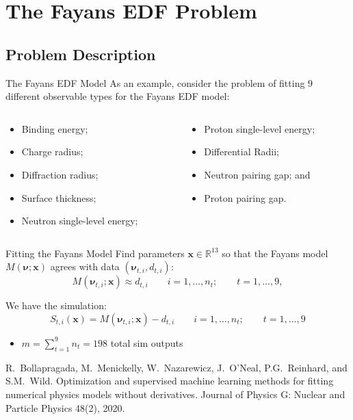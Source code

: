 \documentclass[aspectratio=169]{beamer}
\newcommand{\vx}{\mathbf{x}}
\newcommand{\nub}{\mathbf{\nu}}
\begin{document}
\section{The Fayans EDF Problem}
\subsection{Problem Description}
\begin{frame}{The Fayans EDF Model}
As an example, consider the problem of fitting $9$ different observable
types for the Fayans EDF model:
\begin{columns}
\begin{column}{0.48\textwidth}
\begin{itemize}
\item Binding energy;
\item Charge radius;
\item Diffraction radius;
\item Surface thickness;
\item Neutron single-level energy;
\end{itemize}
\end{column}
\begin{column}{0.48\textwidth}
\begin{itemize}
\item Proton single-level energy;
\item Differential Radii;
\item Neutron pairing gap; and
\item Proton pairing gap.
\end{itemize}
\end{column}
\end{columns}
\end{frame}

\begin{frame}{Fitting the Fayans Model}
Find parameters $\vx \in \mathbb{R}^{13}$ so that the Fayans model
$M\left(\nub;\vx\right)$ agrees with data $(\nub_{t,i},d_{t,i})$:
$$
M\left(\nub_{t,i};\vx\right) \approx d_{t,i} \qquad i=1,\ldots, n_t;
\qquad t=1,\ldots, 9,
$$

\medskip

We have the simulation:
$$
S_{t,i}(\vx) = M\left(\nub_{t,i};\vx\right) - d_{t,i}
\qquad i=1,\ldots, n_t;
\qquad t=1,\ldots, 9
$$
\begin{itemize}
\item $m = \sum_{t=1}^9 n_t = 198$ total sim outputs
\end{itemize}

\vfill

{\tiny 
R.~Bollapragada, M.~Menickelly, W.~Nazarewicz, J.~O'Neal, P.G.~Reinhard, and S.M.~Wild. Optimization and supervised machine learning methods for fitting numerical physics models without derivatives. Journal of Physics G: Nuclear and Particle Physics 48(2), 2020.}\par

\end{frame}
\end{document}
